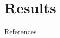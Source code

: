 \documentclass[169]{beamer}
\begin{document}
%

\section{Results}



\appendix

\begin{frame}[allowframebreaks]{References}
  
  
\end{frame}
\end{document}
